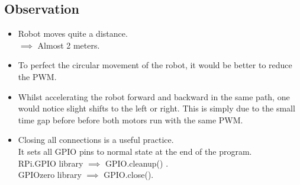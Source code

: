 \subsection*{\Large Observation }
    \begin{itemize}
        \item  Robot moves quite a distance.\\ 
        $\implies$ Almost 2 meters.
        \item To perfect the circular movement of the robot, it would be better to reduce the PWM.
        \item Whilst accelerating the robot forward and backward in the same path, one would notice slight shifts to the left or right. This is simply due to the small time gap before before both motors run with the same PWM.
        \item Closing all connections is a useful practice.\\
        It sets all GPIO pins to normal state at the end of the program.\\
        RPi.GPIO library $\implies$  GPIO.cleanup() .\\
        GPIOzero library $\implies$ GPIO.close().\\
        \end{itemize}
